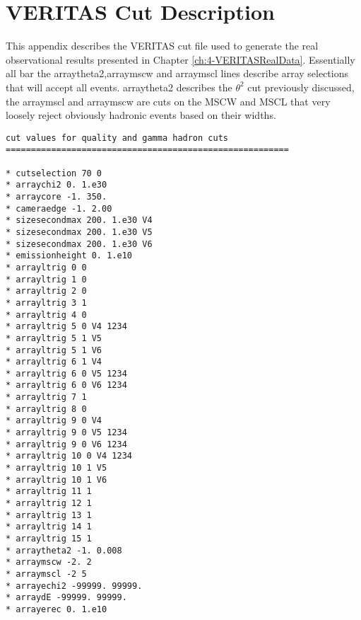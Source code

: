 \chapter{\label{app:1-VERITASCut}VERITAS Cut Description}
This appendix describes the VERITAS cut file used to generate the real observational results presented in Chapter \ref{ch:4-VERITASRealData}. Essentially all bar the arraytheta2,arraymscw and arraymscl lines describe array selections that will accept all events. arraytheta2 describes the $\theta^2$ cut previously discussed, the arraymscl and arraymscw are cuts on the MSCW and MSCL that very loosely reject obviously hadronic events based on their widths.

\begin{lstlisting}[label=verb1,caption=Cut Description Used for the real observations Analysis in Eventdisplay format,float,frame=tb]
cut values for quality and gamma hadron cuts
========================================================

* cutselection 70 0
* arraychi2 0. 1.e30
* arraycore -1. 350.
* cameraedge -1. 2.00
* sizesecondmax 200. 1.e30 V4
* sizesecondmax 200. 1.e30 V5
* sizesecondmax 200. 1.e30 V6
* emissionheight 0. 1.e10
* arrayltrig 0 0
* arrayltrig 1 0
* arrayltrig 2 0
* arrayltrig 3 1
* arrayltrig 4 0
* arrayltrig 5 0 V4 1234
* arrayltrig 5 1 V5
* arrayltrig 5 1 V6
* arrayltrig 6 1 V4
* arrayltrig 6 0 V5 1234
* arrayltrig 6 0 V6 1234
* arrayltrig 7 1
* arrayltrig 8 0
* arrayltrig 9 0 V4
* arrayltrig 9 0 V5 1234
* arrayltrig 9 0 V6 1234
* arrayltrig 10 0 V4 1234
* arrayltrig 10 1 V5
* arrayltrig 10 1 V6
* arrayltrig 11 1
* arrayltrig 12 1
* arrayltrig 13 1
* arrayltrig 14 1
* arrayltrig 15 1
* arraytheta2 -1. 0.008
* arraymscw -2. 2
* arraymscl -2 5
* arrayechi2 -99999. 99999.
* arraydE -99999. 99999.
* arrayerec 0. 1.e10
\end{lstlisting}
